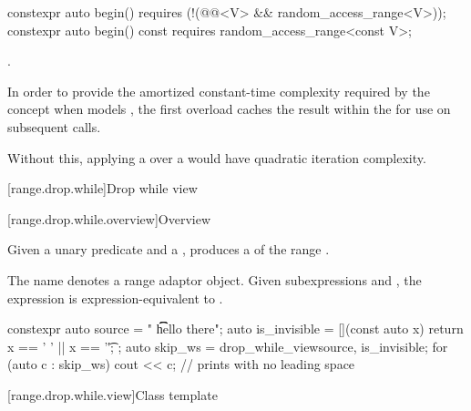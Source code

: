 %
\begin{itemdecl}
constexpr auto begin()
  requires (!(@@<V> && random_access_range<V>));
constexpr auto begin() const
  requires random_access_range<const V>;
\end{itemdecl}

\begin{itemdescr}
\pnum
\returns
{}.

\pnum
\remarks
In order to provide the amortized constant-time complexity required
by the  concept
when  models ,
the first overload caches the result within the 
for use on subsequent calls.
\begin{note}
Without this,
applying a  over a 
would have quadratic iteration complexity.
\end{note}
\end{itemdescr}

[range.drop.while]{Drop while view}

[range.drop.while.overview]{Overview}

\pnum
Given a unary predicate  and a  ,
 produces a 
of the range .

\pnum
The name 
denotes a range adaptor object.
Given subexpressions  and ,
the expression 
is expression-equivalent to .

\pnum
\begin{example}
\begin{codeblock}
constexpr auto source = "  \t   \t   \t   hello there";
auto is_invisible = [](const auto x) { return x == ' ' || x == '\t'; };
auto skip_ws = drop_while_view{source, is_invisible};
for (auto c : skip_ws) {
  cout << c;                                    // prints  with no leading space
}
\end{codeblock}
\end{example}

[range.drop.while.view]{Class template }

